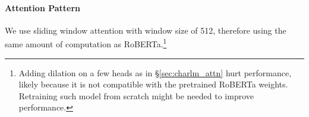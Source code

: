 
\paragraph{Attention Pattern}
We use sliding window attention with window size of 512, therefore using the same amount of computation as RoBERTa.\footnote{Adding dilation on a few heads as in \S\ref{sec:charlm_attn} hurt performance, likely because it is not compatible with the pretrained RoBERTa weights. Retraining such model from scratch might be needed to improve performance.
}

